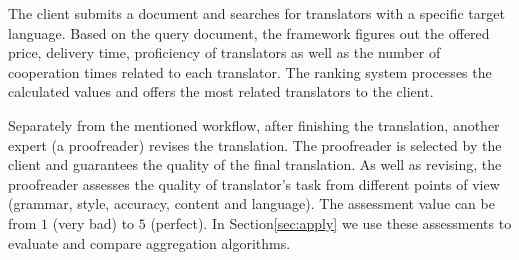 The client submits a document and searches for translators with a specific target language. Based on the query document, the framework figures out the offered price, delivery time, proficiency of translators as well as the number of cooperation times related to each translator. The ranking system processes the calculated values and offers the most related translators to the client.

Separately from the mentioned workflow, after finishing the translation, another expert (a  proofreader) revises the translation. The proofreader is selected by the client and guarantees the quality of the final translation. As well as revising, the proofreader assesses the quality of translator's task from different points of view (grammar, style, accuracy, content and language). The assessment value can be from $1$ (very bad) to $5$ (perfect). In Section\ref{sec:apply} we use these assessments to evaluate and compare aggregation algorithms.
